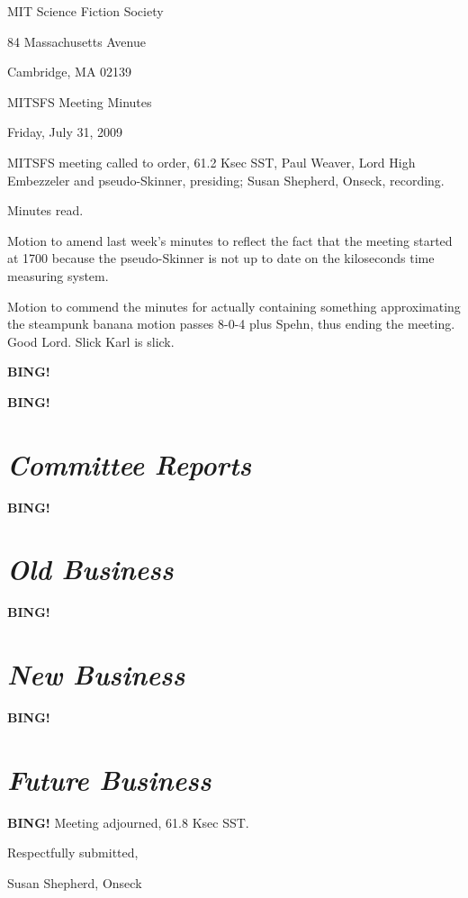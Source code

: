 \documentclass[10pt]{article}
\newcommand{\bing}{{\bf BING!} }
\newcommand{\goto}[1]{\bing \vskip 12pt \section*{{\em{#1}}}}
\newcommand{\ps}{ plus Spehn\xspace}
\begin{document}
\begin{center}

MIT Science Fiction Society

84 Massachusetts Avenue

Cambridge, MA 02139

\vspace{12pt}

MITSFS Meeting Minutes

Friday, July 31, 2009

\end{center}

\vspace{18pt}

\setlength{\parskip}{6pt}

\noindent
MITSFS meeting called to order, 61.2 Ksec SST,
Paul Weaver, Lord High Embezzeler and pseudo-Skinner, presiding; Susan Shepherd, Onseck, recording.

Minutes read.

Motion to amend last week's minutes to reflect the fact that the meeting started at 1700 because the pseudo-Skinner is not up to date on the kiloseconds time measuring system.

Motion to commend the minutes for actually containing something approximating the steampunk banana motion passes 8-0-4\ps, thus ending the meeting. Good Lord. Slick Karl is slick.

\bing 

\goto{Committee Reports}

\goto{Old Business}

\goto{New Business}

\goto{Future Business}

\bing
\noindent
Meeting adjourned, 61.8 Ksec SST.

\vspace{18pt}

\centerline{Respectfully submitted,}
\centerline{Susan Shepherd, Onseck}
\end{document}
